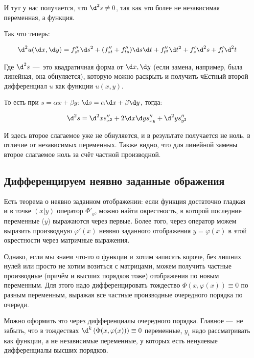\documentclass[12pt, a4paper]{article}
\begin{document}
И тут у нас получается, что $\d^2 s \neq 0$, так как это более не независимая переменная, а функция.

Так что теперь:

\begin{equation}
  \d^2 u(\d x, \d y) = f''_{s^2} \d s^2 + (f''_{st} + f''_{ts}) \d s \d t + f''_{t^2} \d t^2
  + f'_s \d^2 s + f'_t \d^2 t
\end{equation}

Где $\d^2 s$ — это квадратичная форма от $\d x, \d y$ (если замена, например, была линейная, она обнуляется), 
которую можно раскрыть и получить чЕстный второй дифференциал $u$ как функции $u(x, y)$.

То есть при $s = \alpha x + \beta y$:
$\d s = \alpha \d x + \beta \d y$, тогда:

\begin{equation}
  \d^2 s = \d^2 x s''_{x^2} + 2 \d x \d y s''_{xy} + \d^2 y s''_{y^2}
\end{equation}

И здесь второе слагаемое уже не обнуляется, и в результате получается не ноль, в отличие от независимых переменных.
Также видно, что для линейной замены второе слагаемое ноль за счёт частной производной.



\subsection{Дифференцируем неявно заданные ображения}

Есть теорема о неявно заданном отображении: если функция достаточно гладкая и в точке $(x|y)$ оператор $\Phi'_y$, 
можно найти окрестность, в которой последние переменные ($y$) выражаются через первые. 
Более того, через оператор можем выразить производную $\varphi'(x)$ неявно заданного отображения $y = \varphi(x)$ в этой окрестности через матричные выражения.

Однако, если мы знаем что-то о функции и хотим записать короче, без лишних нулей 
или просто не хотим возиться с матрицами, можем получить частные производные (причём и высших порядков тоже)
отображения по новым переменным. Для этого надо дифференцировать тождество $\Phi(x, \varphi(x)) \equiv 0$ по разным переменным, 
выражая все частные производные очередного порядка по очереди.

Можно оформить это через дифференциалы очередного порядка. Главное — не забыть, что в тождествах $\d^k\left( \Phi(x, \varphi(x)) \right) \equiv 0$ 
переменные, $y_i$ надо рассматривать как функции, а не независимые переменные, у которых есть ненулевые дифференциалы высших порядков.
\end{document}
